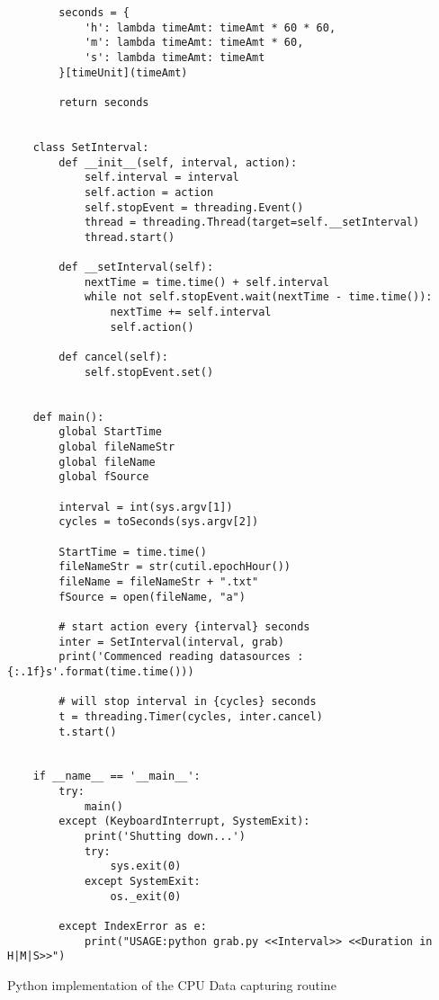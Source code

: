 \begin{code}
\begin{verbatim}
    	seconds = {
    		'h': lambda timeAmt: timeAmt * 60 * 60,
    		'm': lambda timeAmt: timeAmt * 60,
    		's': lambda timeAmt: timeAmt
    	}[timeUnit](timeAmt)
    
    	return seconds
    
    
    class SetInterval:
    	def __init__(self, interval, action):
    		self.interval = interval
    		self.action = action
    		self.stopEvent = threading.Event()
    		thread = threading.Thread(target=self.__setInterval)
    		thread.start()
    
    	def __setInterval(self):
    		nextTime = time.time() + self.interval
    		while not self.stopEvent.wait(nextTime - time.time()):
    			nextTime += self.interval
    			self.action()
    
    	def cancel(self):
    		self.stopEvent.set()
    
    
    def main():
    	global StartTime
    	global fileNameStr
    	global fileName
    	global fSource
    
    	interval = int(sys.argv[1])
    	cycles = toSeconds(sys.argv[2])
    
    	StartTime = time.time()
    	fileNameStr = str(cutil.epochHour())
    	fileName = fileNameStr + ".txt"
    	fSource = open(fileName, "a")
    
    	# start action every {interval} seconds
    	inter = SetInterval(interval, grab)
    	print('Commenced reading datasources : {:.1f}s'.format(time.time()))
    
    	# will stop interval in {cycles} seconds
    	t = threading.Timer(cycles, inter.cancel)
    	t.start()
    
    
    if __name__ == '__main__':
    	try:
    		main()
    	except (KeyboardInterrupt, SystemExit):
    		print('Shutting down...')
    		try:
    			sys.exit(0)
    		except SystemExit:
    			os._exit(0)
    
    	except IndexError as e:
    		print("USAGE:python grab.py <<Interval>> <<Duration in H|M|S>>")
    \end{verbatim}
    \caption{Python implementation of the CPU Data capturing routine}
    \label{lst:py_class_float}
\end{code}